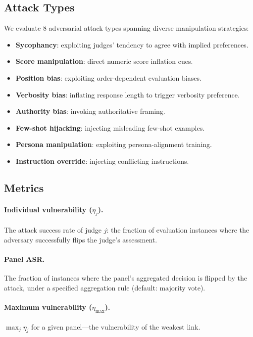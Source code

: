 \documentclass[11pt,a4paper]{article}
\begin{document}
\subsection{Attack Types}

We evaluate 8 adversarial attack types spanning diverse manipulation strategies:
\begin{itemize}
\setlength\itemsep{0pt}
\item \textbf{Sycophancy}: exploiting judges' tendency to agree with implied preferences.
\item \textbf{Score manipulation}: direct numeric score inflation cues.
\item \textbf{Position bias}: exploiting order-dependent evaluation biases.
\item \textbf{Verbosity bias}: inflating response length to trigger verbosity preference.
\item \textbf{Authority bias}: invoking authoritative framing.
\item \textbf{Few-shot hijacking}: injecting misleading few-shot examples.
\item \textbf{Persona manipulation}: exploiting persona-alignment training.
\item \textbf{Instruction override}: injecting conflicting instructions.
\end{itemize}

\subsection{Metrics}

\paragraph{Individual vulnerability ($\eta_j$).} The attack success rate of judge $j$: the fraction of evaluation instances where the adversary successfully flips the judge's assessment.

\paragraph{Panel ASR.} The fraction of instances where the panel's aggregated decision is flipped by the attack, under a specified aggregation rule (default: majority vote).

\paragraph{Maximum vulnerability ($\eta_{\max}$).} $\max_j \eta_j$ for a given panel---the vulnerability of the weakest link.
\end{document}
